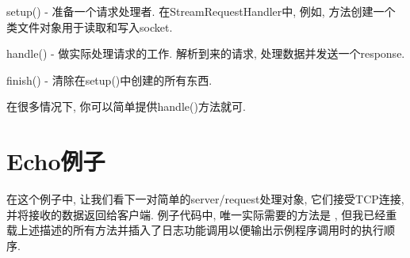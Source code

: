 \documentclass[a4paper,10pt,english]{manual}
\begin{document}
setup() - 准备一个请求处理者. 在StreamRequestHandler中, 例如,  方法创建一个类文件对象用于读取和写入socket.

handle() - 做实际处理请求的工作. 解析到来的请求, 处理数据并发送一个response.

finish() - 清除在setup()中创建的所有东西.

在很多情况下, 你可以简单提供handle()方法就可.


\section{Echo例子}

在这个例子中, 让我们看下一对简单的server/request处理对象, 它们接受TCP连接, 并将接收的数据返回给客户端. 例子代码中, 唯一实际需要的方法是 , 但我已经重载上述描述的所有方法并插入了日志功能调用以便输出示例程序调用时的执行顺序.
\end{document}
